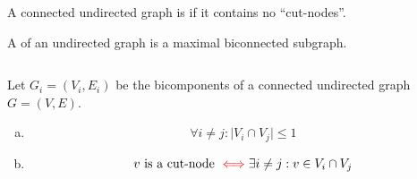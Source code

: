 
\begin{frame}{}
  \begin{definition}
    A connected undirected graph is  if it contains no ``cut-nodes''.
  \end{definition}

  \pause
  \vspace{0.80cm}
  \begin{definition}
    A  of an undirected graph is a maximal biconnected subgraph.
  \end{definition}
\end{frame}

\begin{frame}{}
  \begin{columns}
      \pause
  \end{columns}

  \pause
  \vspace{0.30cm}
  \centerline{ }
\end{frame}

\begin{frame}{}
  \begin{columns}
    \begin{theorem}
	Let $G_i = (V_i, E_i)$ be the bicomponents of a connected undirected graph $G = (V, E)$.
	
	\begin{enumerate}[(a)]
	  \pause
	  \item 
	    \[
	      \forall i \neq j: \Big\lvert V_i \cap V_j \Big\rvert \le 1
	    \]
	  \pause
	  \item
	    \[
	      v \text{ is a cut-node } \textcolor{red}{\iff} \exists i \neq j: v \in V_i \cap V_j
	    \]
	\end{enumerate}
      \end{theorem}
  \end{columns}
\end{frame}


